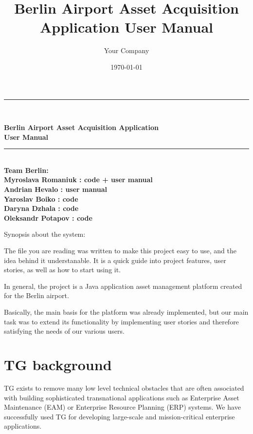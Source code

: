 \documentclass[a4paper, 12pt, final]{hitec}
\title{Berlin Airport Asset Acquisition Application User Manual}
\author{Your Company}
\date{\today}
\begin{document}
	\onehalfspacing
  \begin{titlepage}
      \centering
        \vspace*{0.5 cm}
      \rule{\linewidth}{0.2 mm} \\[0.4cm]
      \begin{spacing}{1.1}
        \huge \bfseries Berlin Airport Asset Acquisition Application\\[0.3cm]
        \LARGE User Manual
      \end{spacing}
      \rule{\linewidth}{0.2 mm} \\[1 cm]
      \large \bfseries Team Berlin: \\
        Myroslava Romaniuk : code + user manual \\
        Andrian Hevalo : user manual \\
        Yaroslav Boiko : code \\
        Daryna Dzhala : code \\
        Oleksandr Potapov : code
      \clearpage
      
      \setcounter{page}{1}
      \justifying Synopsis about the system:

      The file you are reading was written to make this project easy to use,
      and the idea behind it understanable. It is a quick guide into project
      features, user stories, as well as how to start using it.
      
      In general, the project is a Java application asset management platform
      created for the Berlin airport.

      Basically, the main basis for the platform was already implemented,
      but our main task was to extend its functionality by implementing user stories
      and therefore satisfying the needs of our various users. 
      \clearpage
        
      \setcounter{tocdepth}{3}
      \tableofcontents
      \clearpage
  \end{titlepage}

  \section{TG background}\label{sec:01}
  TG exists to remove many low level technical obstacles that are
  often associated with building sophisticated transnational applications
  such as Enterprise Asset Maintenance (EAM) or Enterprise Resource Planning
  (ERP) systems. We have successfully used TG for developing large-scale and
  mission-critical enterprise applications.
\end{document}
